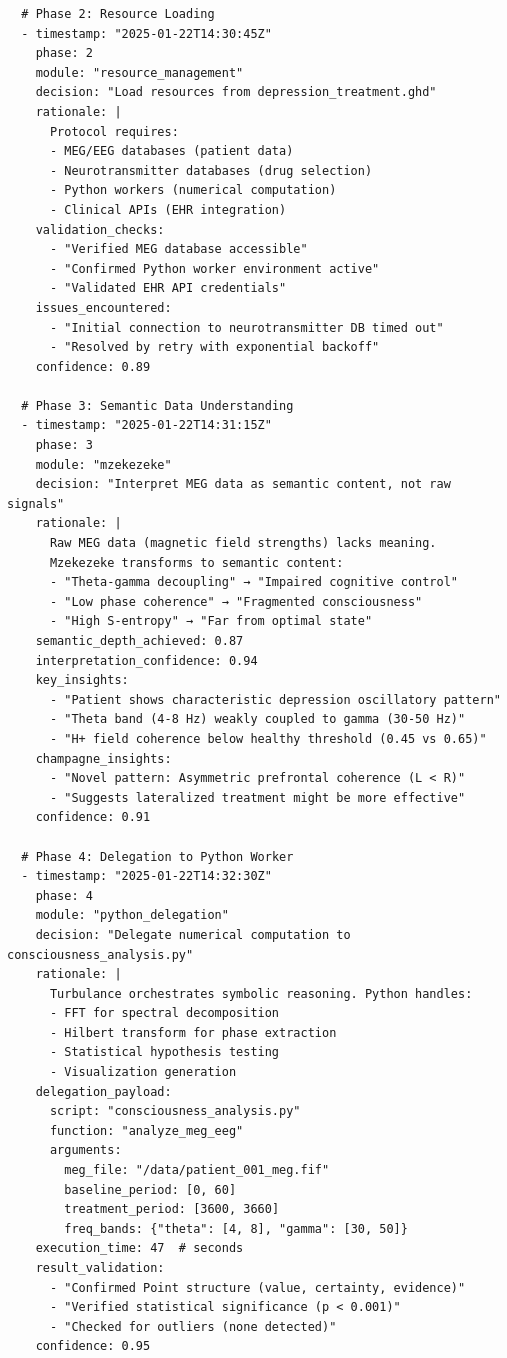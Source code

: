 \begin{verbatim}
  # Phase 2: Resource Loading
  - timestamp: "2025-01-22T14:30:45Z"
    phase: 2
    module: "resource_management"
    decision: "Load resources from depression_treatment.ghd"
    rationale: |
      Protocol requires:
      - MEG/EEG databases (patient data)
      - Neurotransmitter databases (drug selection)
      - Python workers (numerical computation)
      - Clinical APIs (EHR integration)
    validation_checks:
      - "Verified MEG database accessible"
      - "Confirmed Python worker environment active"
      - "Validated EHR API credentials"
    issues_encountered:
      - "Initial connection to neurotransmitter DB timed out"
      - "Resolved by retry with exponential backoff"
    confidence: 0.89
  
  # Phase 3: Semantic Data Understanding
  - timestamp: "2025-01-22T14:31:15Z"
    phase: 3
    module: "mzekezeke"
    decision: "Interpret MEG data as semantic content, not raw signals"
    rationale: |
      Raw MEG data (magnetic field strengths) lacks meaning.
      Mzekezeke transforms to semantic content:
      - "Theta-gamma decoupling" → "Impaired cognitive control"
      - "Low phase coherence" → "Fragmented consciousness"
      - "High S-entropy" → "Far from optimal state"
    semantic_depth_achieved: 0.87
    interpretation_confidence: 0.94
    key_insights:
      - "Patient shows characteristic depression oscillatory pattern"
      - "Theta band (4-8 Hz) weakly coupled to gamma (30-50 Hz)"
      - "H+ field coherence below healthy threshold (0.45 vs 0.65)"
    champagne_insights:
      - "Novel pattern: Asymmetric prefrontal coherence (L < R)"
      - "Suggests lateralized treatment might be more effective"
    confidence: 0.91
  
  # Phase 4: Delegation to Python Worker
  - timestamp: "2025-01-22T14:32:30Z"
    phase: 4
    module: "python_delegation"
    decision: "Delegate numerical computation to consciousness_analysis.py"
    rationale: |
      Turbulance orchestrates symbolic reasoning. Python handles:
      - FFT for spectral decomposition
      - Hilbert transform for phase extraction
      - Statistical hypothesis testing
      - Visualization generation
    delegation_payload:
      script: "consciousness_analysis.py"
      function: "analyze_meg_eeg"
      arguments:
        meg_file: "/data/patient_001_meg.fif"
        baseline_period: [0, 60]
        treatment_period: [3600, 3660]
        freq_bands: {"theta": [4, 8], "gamma": [30, 50]}
    execution_time: 47  # seconds
    result_validation:
      - "Confirmed Point structure (value, certainty, evidence)"
      - "Verified statistical significance (p < 0.001)"
      - "Checked for outliers (none detected)"
    confidence: 0.95
  

\end{verbatim}
